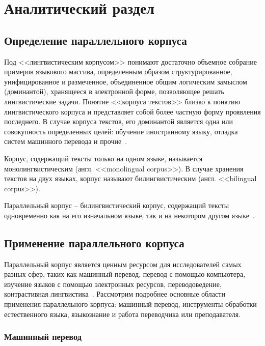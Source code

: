 \section{Аналитический раздел}

\subsection{Определение параллельного корпуса}

Под <<лингвистическим корпусом>> понимают достаточно объемное собрание примеров языкового массива, определенным образом структурированное, унифицированное и размеченное, объединенное общим логическим замыслом (доминантой), хранящееся в электронной форме, позволяющее решать лингвистические задачи. 
Понятие <<корпуса текстов>> близко к понятию лингвистического корпуса и представляет собой более частную форму проявления последнего. 
В случае корпуса текстов, его доминантой является одна или совокупность определенных целей: обучение иностранному языку, отладка систем машинного перевода и прочие~\cite{maltseva-opredelenie-korpusa-2011}.

Корпус, содержащий тексты только на одном языке, называется монолингвистическим (англ. <<monolingual corpus>>). 
В случае хранения текстов на двух языках, корпус называют билингвистическим (англ. <<bilingual corpus>>).

Параллельный корпус -- билингвистический корпус, содержащий тексты одновременно как на его изначальном языке, так и на некотором другом языке~\cite{khosla-survey-report-2018}.

\subsection{Применение параллельного корпуса}

Параллельный корпус является ценным ресурсом для исследователей самых разных сфер, таких как машинный перевод, перевод с помощью компьютера, изучение языков с помощью электронных ресурсов, переводоведение, контрастивная лингвистика~\cite{spyns-theory-and-applications-NLP-2013}.
Рассмотрим подробнее основные области применения параллельного корпуса: машинный перевод, инструменты обработки естественного языка, языкознание и работа переводчика или преподавателя.

\subsubsection{Машинный перевод}
	
